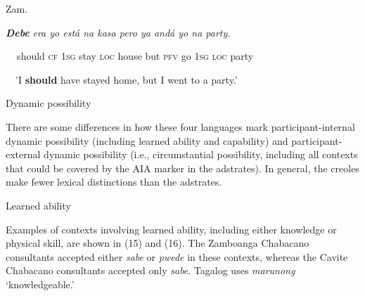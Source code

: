 \begin{listWWNumiileveli}
\item 
\begin{stylelsLanginfo}
\label{bkm:Ref52721750}Zam.
\end{stylelsLanginfo}
\end{listWWNumiileveli}
\begin{stylelsLanginfo}
\textbf{\textit{Debe}}\textit{ era yo está na kasa pero ya andá yo na party.}
\end{stylelsLanginfo}

\begin{stylelsLanginfo}
\textbf{\ \ }should \textsc{cf} 1\textsc{sg} stay \textsc{loc} house but \textsc{pfv} go 1\textsc{sg} \textsc{loc} party
\end{stylelsLanginfo}

\begin{stylelsSourceline}
\textup{\ \ {}'I }\textbf{\textup{should}}\textup{ have stayed home, but I went to a party.'}
\end{stylelsSourceline}


\setcounter{listWWNumiiileveli}{0}
\begin{listWWNumiiileveli}
\item 

\setcounter{listWWNumiiilevelii}{0}
\begin{listWWNumiiilevelii}
\item 
\begin{stylelsSectionii}
Dynamic possibility
\end{stylelsSectionii}
\end{listWWNumiiilevelii}
\end{listWWNumiiileveli}
\begin{styleStandard}
There are some differences in how these four languages mark participant-internal dynamic possibility (including learned ability and capability) and participant-external dynamic possibility (i.e., circumstantial possibility, including all contexts that could be covered by the AIA marker in the adstrates). In general, the creoles make fewer lexical distinctions than the adstrates. 
\end{styleStandard}

\begin{listWWNumiiileveli}
\item 
\begin{stylelsSectioniii}
Learned ability
\end{stylelsSectioniii}
\end{listWWNumiiileveli}
\begin{styleStandard}
Examples of contexts involving learned ability, including either knowledge or physical skill, are shown in (15) and (16). The Zamboanga Chabacano consultants accepted either \textit{sabe} or \textit{pwede} in these contexts, whereas the Cavite Chabacano consultants accepted only \textit{sabe}. Tagalog uses \textit{marunong} ‘knowledgeable.’ 
\end{styleStandard}


